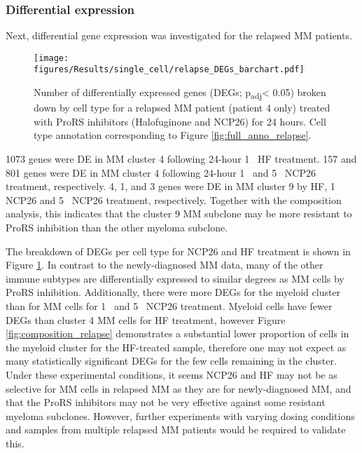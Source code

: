 \subsubsection{Differential expression}
Next, differential gene expression was investigated for the relapsed MM patients.
%
\begin{figure}[htb]
\centering
\texttt{[image: figures/Results/single\_cell/relapse\_DEGs\_barchart.pdf]}
\caption[DEGs per cell type- relapsed MM]{Number of differentially expressed genes (DEGs; p\textsubscript{adj}< 0.05) broken down by cell type for a relapsed MM patient (patient 4 only) treated with ProRS inhibitors (Halofuginone and NCP26) for 24 hours.
Cell type annotation corresponding to Figure \ref{fig:full_anno_relapse}.}
\label{fig:relapse_deg_bar}
\end{figure}
%
1073 genes were DE in MM cluster 4 following 24-hour 1\si{\micro\Molar} HF treatment.
157 and 801 genes were DE in MM cluster 4 following 24-hour 1\si{\micro\Molar}  and 5\si{\micro\Molar} NCP26 treatment, respectively.
4, 1, and 3 genes were DE in MM cluster 9 by HF, 1\si{\micro\Molar} NCP26  and 5\si{\micro\Molar} NCP26 treatment, respectively.
Together with the composition analysis, this indicates that the cluster 9 MM subclone may be more resistant to ProRS inhibition than the other myeloma subclone.

The breakdown of DEGs per cell type for NCP26 and HF treatment is shown in Figure \ref{fig:relapse_deg_bar}.
In contrast to the newly-diagnosed MM data, many of the other immune subtypes are differentially expressed to similar degrees as MM cells by ProRS inhibition.
Additionally, there were more DEGs for the myeloid cluster than for MM cells for 1\si{\micro\Molar} and 5\si{\micro\Molar}  NCP26 treatment.
Myeloid cells have fewer DEGs than cluster 4 MM cells for HF treatment, however Figure \ref{fig:composition_relapse} demonstrates a substantial lower proportion of cells in the myeloid cluster for the HF-treated sample, therefore one may not expect as many statistically significant DEGs for the few cells remaining in the cluster.
Under these experimental conditions, it seems NCP26 and HF may not be as selective for MM cells in relapsed MM as they are for newly-diagnosed MM, and that the ProRS inhibitors may not be very effective against some resistant myeloma subclones.
However, further experiments with varying dosing conditions and samples from multiple relapsed MM patients would be required to validate this.

